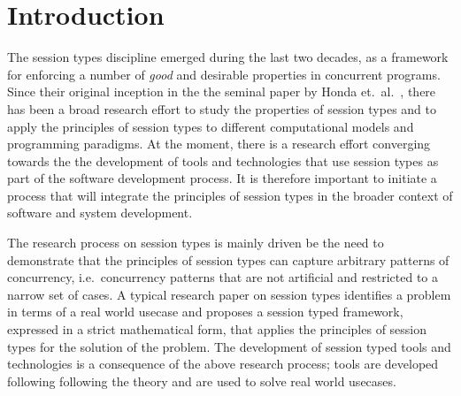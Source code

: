 \section{Introduction}

The session types discipline emerged during the last
two decades, as a framework for enforcing a number
of {\em good} and desirable properties in concurrent
programs.
Since their original inception in the the seminal paper by
Honda et.~al.~\cite{honda.vasconcelos.kubo:language-primitives},
there has been a broad research effort to study the properties
of session types and to apply the principles of session types
to different computational models and programming paradigms. 
At the moment, there is a research effort converging towards
the the development of tools and technologies that use session
types as part of the software development process.
It is therefore important to initiate a process that will
integrate the principles of session types in the broader context
of software and system development.


The research process on session types is mainly driven
be the need to demonstrate that the principles of session types
can capture arbitrary patterns of concurrency,
i.e.~concurrency patterns that are not artificial and restricted
to a narrow set of cases.
A typical research paper on session types identifies a problem
in terms of a real world usecase and proposes a session typed
framework, expressed in a strict mathematical form, that applies
the principles of session types for the solution of the problem.
The development of session typed tools and technologies is a
consequence of the above research process; tools are developed
following following the theory and are used to solve real
world usecases.

